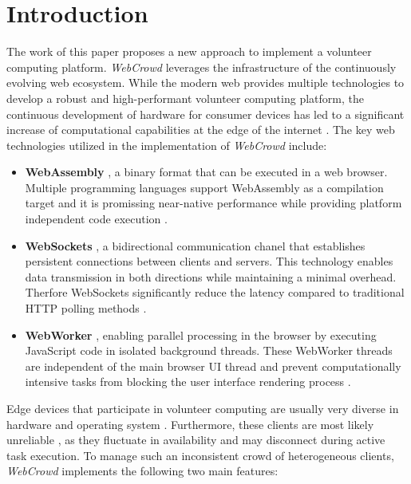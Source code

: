 \chapter{Introduction}
\label{ch:intro}
The work of this paper proposes a new approach to implement a volunteer computing platform. \emph{WebCrowd} leverages the infrastructure of the continuously evolving web ecosystem. While the modern web provides multiple technologies to develop a robust and high-performant volunteer computing platform, the continuous development of hardware for consumer devices has led to a significant increase of computational capabilities at the edge of the internet \cite{relatedwork:mobilecloud, relatedwork:wasmedgecomputing}. The key web technologies utilized in the implementation of \emph{WebCrowd} include:
\begin{itemize}
    \item \textbf{WebAssembly} \cite{methodology:wasm2}, a binary format that can be executed in a web browser. Multiple programming languages support WebAssembly as a compilation target and it is promissing near-native performance while providing platform independent code execution \cite{methodology:wasm}.
    \item \textbf{WebSockets} \cite{methodology:websockets1}, a bidirectional communication chanel that establishes persistent connections between clients and servers. This technology enables data transmission in both directions while maintaining a minimal overhead. Therfore WebSockets significantly reduce the latency compared to traditional \acs{HTTP} polling methods \cite{methodology:websockets3}. 
    \item \textbf{WebWorker} \cite{methodology:webworkers}, enabling parallel processing in the browser by executing JavaScript code in isolated background threads. These WebWorker threads are independent of the main browser UI thread and prevent computationally intensive tasks from blocking the user interface rendering process \cite{methodology:webworkers}.
\end{itemize}
Edge devices that participate in volunteer computing are usually very diverse in hardware and operating system \cite{intro:diverseDevices}. Furthermore, these clients are most likely unreliable \cite{relatedwork:boinc1}, as they fluctuate in availability and may disconnect during active task execution. To manage such an inconsistent crowd of heterogeneous clients, \emph{WebCrowd} implements the following two main features:
